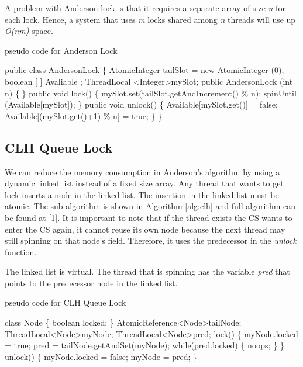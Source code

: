 \documentclass[twoside]{article}
\renewcommand{\cite}[1]{[#1]}
\begin{document}
A problem with Anderson lock is that it requires a separate array of size \emph{n} for each lock. Hence, a system that uses \emph{m} locks shared among \emph{n} threads will use up \emph{O(nm)} space.

\begin{algorithm}
\caption{pseudo code for Anderson Lock}
\begin{algorithmic}[1]
\State public class AndersonLock \{
\State \indent AtomicInteger tailSlot = new AtomicInteger (0); 
\State \indent boolean [ ] Avaliable ;
\State \indent ThreadLocal \textless Integer\textgreater mySlot;  \newline
\State \indent public AndersonLock (int n) \{ 
\State \indent \} 
\State \indent public void lock() \{
\State \indent \indent mySlot.set(tailSlot.getAndIncrement() \% n);
\State \indent \indent spinUntil (Available[mySlot]);
\State \indent \}
\State \indent public void unlock() \{
\State \indent \indent Available[mySlot.get()] = false;
\State \indent \indent Available[(mySlot.get()+1) \% n] = true;
\State \indent \}
\State \}
\end{algorithmic}
\label{alg:anderson}
\end{algorithm}

\subsection{CLH Queue Lock}


We can reduce the memory consumption in Anderson's algorithm by using a dynamic linked list instead of a fixed size array. Any thread that wants to get lock inserts a node in the linked list. The insertion in the linked list must be atomic. The sub-algorithm is shown in Algorithm \ref{alg:clh} and full algorithm can be found at \cite{1}. It is important to note that if the thread exists the CS wants to enter the CS again, it cannot reuse its own node because the next thread may still spinning on that node's field. Therefore, it uses the predecessor in the \textit{unlock} function.

The linked list is virtual. The thread that is spinning has the variable \textit{pred} that points to the predecessor node in the linked list.

\begin{algorithm}
\caption{pseudo code for CLH Queue Lock}
\begin{algorithmic}[1]
\State class Node \{
\State \indent boolean locked;
\State \}
\State AtomicReference\textless Node\textgreater tailNode;
\State ThreadLocal\textless Node\textgreater myNode;
\State ThreadLocal\textless Node\textgreater pred;
\State lock() \{
\State \indent myNode.locked = true;
\State \indent pred = tailNode.getAndSet(myNode);
\State \indent while(pred.locked) \{ noops; \}
\State \}
\State unlock() \{
\State \indent myNode.locked = false;
\State \indent myNode = pred; 
\State \}
\end{algorithmic}
\label{alg:clh}
\end{algorithm}
\end{document}
